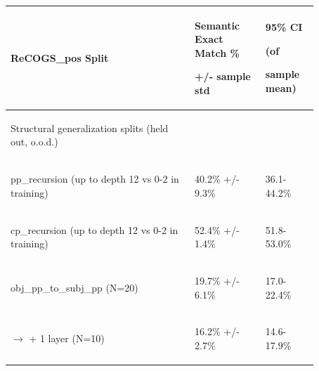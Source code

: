 \documentclass[11pt]{article}
\begin{document}
\begin{table}
\centering
\begin{tabular}{p{0.52\linewidth} p{0.20\linewidth} p{0.15\linewidth}}
\hline
\begin{tiny}\textbf{ReCOGS\_pos Split}\end{tiny} & \begin{tiny}\textbf{Semantic Exact Match \%}

+/- sample std\end{tiny} & \begin{tiny} \textbf{95\% CI}

(of 

sample mean)\end{tiny} \\
\hline
\begin{tiny}Structural generalization splits (held out, o.o.d.)\end{tiny} & \\
\hline
\begin{tiny}pp\_recursion (up to depth 12 vs 0-2 in training)\end{tiny} & \begin{tiny} 40.2\% +/- 9.3\% \end{tiny} & \begin{tiny}36.1-44.2\%\end{tiny} \\
\begin{tiny}cp\_recursion (up to depth 12 vs 0-2 in training)\end{tiny} & \begin{tiny} 52.4\% +/- 1.4\% \end{tiny} & \begin{tiny}51.8-53.0\%\end{tiny} \\
\begin{tiny}obj\_pp\_to\_subj\_pp (N=20)\end{tiny} & \begin{tiny} 19.7\% +/- 6.1\% \end{tiny} & \begin{tiny}17.0-22.4\%\end{tiny} \\
\begin{tiny} $\rightarrow$ + 1 layer (N=10)\end{tiny} & \begin{tiny} 16.2\% +/- 2.7\%\end{tiny} & \begin{tiny}14.6-17.9\%\end{tiny} \\

\end{tabular}
\end{table}
\end{document}
